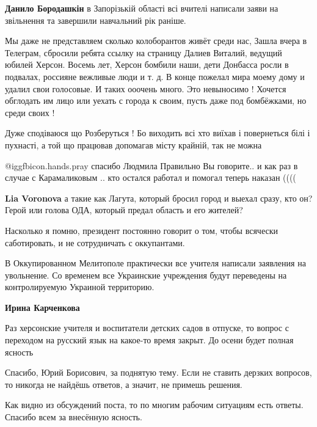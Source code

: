 \begin{itemize}
\textbf{Данило Бородашкін} в Запорізькій області всі вчителі написали заяви на звільнення та завершили навчальний рік раніше.


Мы даже не представляем сколько колоборантов живёт среди нас, Зашла вчера в
Телеграм, сбросили ребята ссылку на страницу Далиев Виталий, ведущий юбилей
Херсон. Восемь лет, Херсон бомбили наши, дети Донбасса росли в подвалах,
россияне вежливые люди и т. д. В конце пожелал мира моему дому и удалил свои
голосовые. И таких ооочень много. Это невыносимо ! Хочется обглодать им лицо
или уехать с города к своим, пусть даже под бомбёжками, но среди своих !


Дуже сподіваюся що Розберуться ! Бо виходить всі хто виїхав і повернеться білі
і пухнасті, а той що працював допомагав місту крайній, так не можна

\begin{itemize} %
 @igg{fbicon.hands.pray}  спасибо Людмила
Правильно Вы говорите.. и как раз в случае с Карамаликовым .. кто остался работал и помогал теперь наказан ((((

\textbf{Lia Voronova} а такие как Лагута, который бросил город и выехал сразу, кто он? Герой или голова ОДА, который предал область и его жителей?
\end{itemize} %


Насколько я помню, президент постоянно говорит о том, чтобы всячески
саботировать, и не сотрудничать с оккупантами.


В Оккупированном Мелитополе практически все учителя написали заявления на
увольнение. Со временем все Украинские учреждения будут переведены на
контролируемую Украиной территорию.

\textbf{Ирина Карченкова} 

Раз херсонские учителя и воспитатели детских садов в отпуске, то вопрос с
переходом на русский язык на какое-то время закрыт. До осени будет полная
ясность


Спасибо, Юрий Борисович, за поднятую тему. Если не ставить дерзких вопросов, то
никогда не найдёшь ответов, а значит, не примешь решения.

Как видно из обсуждений поста, то по многим рабочим ситуациям есть ответы.
Спасибо всем за внесённую ясность.


\end{itemize}
